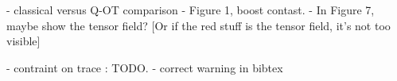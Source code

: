 - classical versus Q-OT comparison
- Figure 1, boost contast.
- In Figure 7, maybe show the tensor field?  [Or if the red stuff is the tensor field, it's not too visible]

- contraint on trace : TODO.
- correct warning in bibtex
